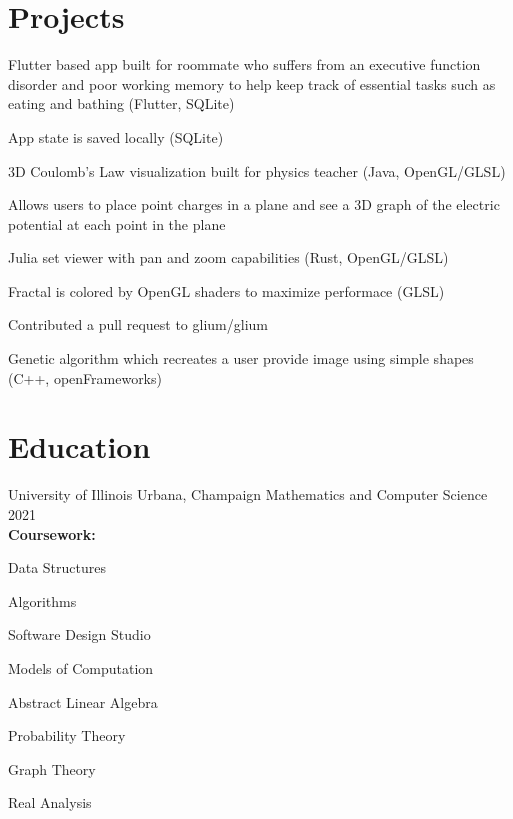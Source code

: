 \documentclass[hidelinks,11pt]{extarticle}
\begin{document}
\section{Projects}

{
    \item Flutter based app built for roommate who suffers from an executive 
        function disorder and poor working memory to help keep track of essential 
        tasks such as eating and bathing (Flutter, SQLite)
    \item App state is saved locally (SQLite)
}

{
    \item 3D Coulomb's Law visualization built for physics teacher (Java, OpenGL/GLSL)
    \item Allows users to place point charges in a plane and see a 3D graph of the
        electric potential at each point in the plane
}

{
    \item Julia set viewer with pan and zoom capabilities (Rust, OpenGL/GLSL)
    \item Fractal is colored by OpenGL shaders to maximize performace (GLSL)
    \item Contributed a pull request to glium/glium
}

{
    \item Genetic algorithm which recreates a user provide image using simple 
        shapes (C++, openFrameworks)
}



\section{Education}
\school
{University of Illinois}
{Urbana, Champaign}
{Mathematics and Computer Science}
{2021}
\\
\textbf{Coursework:} 
\begin{citemize*}
    \item[] Data Structures 
    \item Algorithms 
    \item Software Design Studio 
    \item Models of Computation 
    \item Abstract Linear Algebra 
    \item Probability Theory 
    \item Graph Theory 
    \item Real Analysis 
\end{citemize*}
\end{document}
